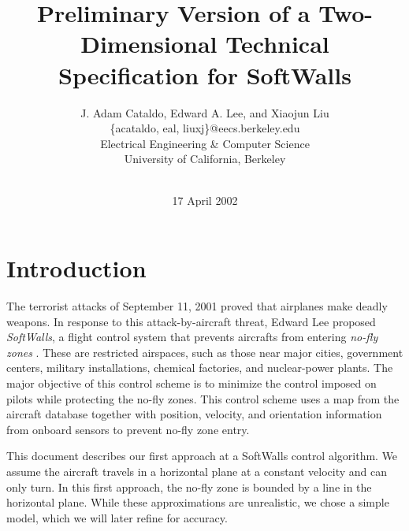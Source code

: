 \documentclass[11pt]{article}
\begin{document}


\title{Preliminary Version of a Two-Dimensional Technical
Specification for SoftWalls}
\author{J. Adam Cataldo, Edward A. Lee, and
Xiaojun Liu\\ \{acataldo, eal, liuxj\}@eecs.berkeley.edu\\ Electrical
Engineering \& Computer Science\\ University of California, Berkeley\\
\\} 
\date{17 April 2002}

\maketitle


\section{Introduction}

The terrorist attacks of September 11, 2001 proved that airplanes make
deadly weapons.  In response to this attack-by-aircraft threat, Edward
Lee proposed \textit{SoftWalls}, a flight control system that
prevents aircrafts from entering \textit{no-fly zones} \cite{Lee}.  These are
restricted airspaces, such as those near major cities, government
centers, military installations, chemical factories, and nuclear-power
plants.  The major objective of this control scheme is to
minimize the control imposed on pilots while protecting the no-fly
zones.  This control scheme uses a map from the aircraft database
together with position, velocity, and orientation information from
onboard sensors to prevent no-fly zone entry.
 
This document describes our first approach at a SoftWalls control
algorithm.  We assume the aircraft travels in a horizontal plane at a
constant velocity and can only turn.  In this first approach, the
no-fly zone is bounded by a line in the horizontal plane.  While these
approximations are unrealistic, we chose a simple model, which we will
later refine for accuracy.

\end{document}
